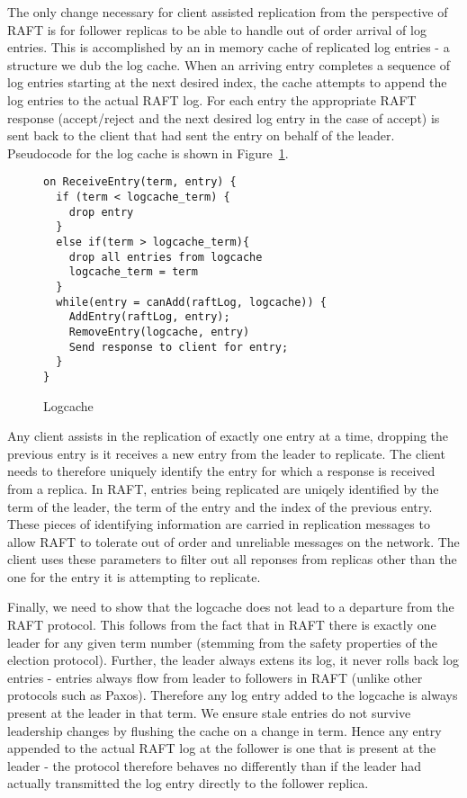 \documentclass[twocolumn]{article}
\begin{document}
The only change necessary for client assisted replication from the perspective
of RAFT is for follower replicas to be able to handle out of order arrival of
log entries. This is accomplished by an in memory cache of replicated log
entries - a structure we dub the log cache. When an arriving entry completes a
sequence of log entries starting at the next desired index, the cache attempts
to append the log entries to the actual RAFT log. For each entry the appropriate
RAFT response (accept/reject and the next desired log entry in the case of
accept) is sent back to the client that had sent the entry on behalf of the
leader. Pseudocode for the log cache is shown in Figure~\ref{fig:logcache}.

\begin{figure}
{ \scriptsize
\begin{verbatim}
on ReceiveEntry(term, entry) {
  if (term < logcache_term) {
    drop entry
  }
  else if(term > logcache_term){
    drop all entries from logcache
    logcache_term = term
  }
  while(entry = canAdd(raftLog, logcache)) {
    AddEntry(raftLog, entry);
    RemoveEntry(logcache, entry)
    Send response to client for entry;
  }
}
\end{verbatim}
}
\caption{Logcache}
\label{fig:logcache}
\end{figure}

Any client assists in the replication of exactly one entry at a time, dropping
the previous entry is it receives a new entry from the leader to replicate. The
client needs to therefore uniquely identify the entry for which a response is
received from a replica. In RAFT, entries being replicated are uniqely
identified by the term of the leader, the term of the entry and the index of the
previous entry. These pieces of identifying information are carried in
replication messages to allow RAFT to tolerate out of order and unreliable
messages on the network. The client uses these parameters to filter out all
reponses from replicas other than the one for the entry it is attempting to
replicate.

Finally, we need to show that the logcache does not lead to a departure from the
RAFT protocol. This follows from the fact that in RAFT there is exactly one
leader for any given term number (stemming from the safety properties of the
election protocol). Further, the leader always extens its log, it never rolls
back log entries - entries always flow from leader to followers in RAFT (unlike
other protocols such as Paxos). Therefore any log entry added to the logcache is
always present at the leader in that term. We ensure stale entries do not
survive leadership changes by flushing the cache on a change in term. Hence any
entry appended to the actual RAFT log at the follower is one that is present at
the leader - the protocol therefore behaves no differently than if the leader
had actually transmitted the log entry directly to the follower replica. 
\end{document}
